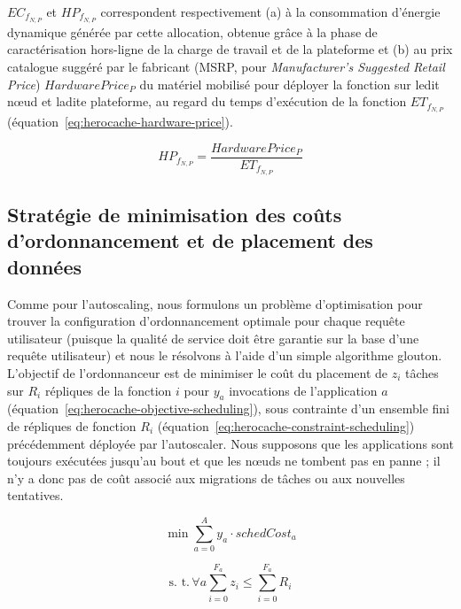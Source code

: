 {${EC}_{{f}_{N, P}}$ et ${HP}_{{f}_{N, P}}$ correspondent respectivement (a) à la consommation d'énergie dynamique générée par cette allocation, obtenue grâce à la phase de caractérisation hors-ligne de la charge de travail et de la plateforme et (b) au prix catalogue suggéré par le fabricant (\gls{MSRP}, pour \textit{Manufacturer's Suggested Retail Price}) $Hardware Price_{P}$ du matériel mobilisé pour déployer la fonction sur ledit nœud et ladite plateforme, au regard du temps d'exécution de la fonction $ET_{{f}_{N, P}}$ (équation~\ref{eq:herocache-hardware-price}).

\begin{equation}
    {HP}_{{f}_{N, P}} = \frac{Hardware Price_{P}}{ET_{{f}_{N, P}}}
\label{eq:herocache-hardware-price}
\end{equation}

\subsection{Stratégie de minimisation des coûts d'ordonnancement et de placement des données}

Comme pour l'autoscaling, nous formulons un problème d'optimisation pour trouver la configuration d'ordonnancement optimale pour chaque requête utilisateur (puisque la qualité de service doit être garantie sur la base d'une requête utilisateur) et nous le résolvons à l'aide d'un simple algorithme glouton. L'objectif de l'ordonnanceur est de minimiser le coût du placement de $z_i$ tâches sur $R_i$ répliques de la fonction $i$ pour $y_a$ invocations de l'application $a$ (équation~\ref{eq:herocache-objective-scheduling}), sous contrainte d'un ensemble fini de répliques de fonction $R_{i}$ (équation~\ref{eq:herocache-constraint-scheduling}) précédemment déployée par l'autoscaler. Nous supposons que les applications sont toujours exécutées jusqu'au bout et que les nœuds ne tombent pas en panne ; il n'y a donc pas de coût associé aux migrations de tâches ou aux nouvelles tentatives.

\begin{equation}
    \min \sum_{a = 0}^{A} y_a \cdot schedCost_{a}
\label{eq:herocache-objective-scheduling}
\end{equation}

\begin{equation}
    \text{s. t.} \, \forall a \sum_{i = 0}^{F_a} z_i \leq \sum_{i = 0}^{F_a} R_{i}
\label{eq:herocache-constraint-scheduling}
\end{equation}

}
